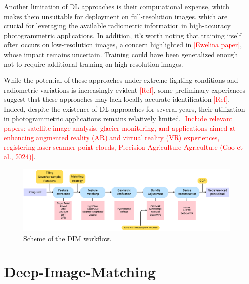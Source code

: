 Another limitation of DL approaches is their computational expense, which makes them unsuitable for deployment on full-resolution images, which are crucial for leveraging the available radiometric information in high-accuracy photogrammetric applications.
In addition, it's worth noting that training itself often occurs on low-resolution images, a concern highlighted in \textcolor{red}{[Ewelina paper]}, whose impact remains uncertain.
Training could have been generalized enough not to require additional training on high-resolution images. 

While the potential of these approaches under extreme lighting conditions and radiometric variations is increasingly evident \textcolor{red}{[Ref]}, some preliminary experiences suggest that these approaches may lack locally accurate identification \textcolor{red}{[Ref]}. 
Indeed, despite the existence of DL approaches for several years, their utilization in photogrammetric applications remains relatively limited. 
\textcolor{red}{[Include relevant papers: satellite image analysis, glacier monitoring, and applications aimed at enhancing augmented reality (AR) and virtual reality (VR) experiences, registering laser scanner point clouds, Precision Agriculture Agriculture (Gao et al., 2024)]}.

\begin{figure}[ht]
    \centering
    \includegraphics[width=1\textwidth]{dim_workflow_simple}
    \caption{Scheme of the DIM workflow.}
    \label{fig:5:dim_workflow}
\end{figure}

\section{Deep-Image-Matching}

